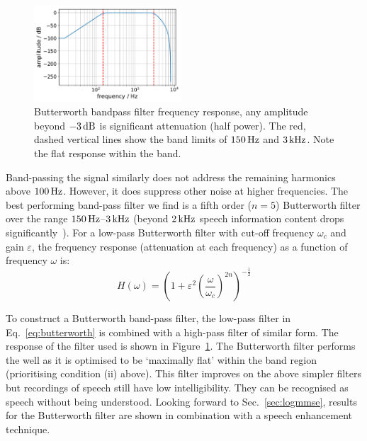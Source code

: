 \documentclass[paper-main.tex]{subfiles}
\begin{document}
\begin{figure}
	\includegraphics[width=0.49\textwidth]{figures/butterworth_150_3000.pdf}
	\caption{Butterworth bandpass filter frequency response, any amplitude beyond $-3\,{\rm dB}$ is significant attenuation (half power). The red, dashed vertical lines show the band limits of $150\,{\rm Hz}$ and $3\,{\rm kHz}$. Note the flat response within the band.}
	\label{fig:butterworth}
\end{figure}


Band-passing the signal similarly does not address the remaining harmonics above $100\,{\rm Hz}$. 
However, it does suppress other noise at higher frequencies. 
The best performing band-pass filter we find is a fifth order ($n = 5$) Butterworth filter over the range $150\,{\rm Hz}$--$3\,{\rm kHz}$ (beyond $2\,{\rm kHz}$ speech information content drops significantly~\cite{speech_intelligibility}). 
For a low-pass Butterworth filter with cut-off frequency $\omega_c$ and gain $\varepsilon$, the frequency response (attenuation at each frequency) as a function of frequency $\omega$ is:
\begin{equation}
\label{eq:butterworth}
H(\omega) = \left(1+\varepsilon^2 \left( \frac{\omega}{\omega_c} \right)^{2n}\right)^{-\frac{1}{2}}
\end{equation}

To construct a Butterworth band-pass filter, the low-pass filter in Eq.~\ref{eq:butterworth} is combined with a high-pass filter of similar form. 
The response of the filter used is shown in Figure~\ref{fig:butterworth}. 
The Butterworth filter performs the well as it is optimised to be `maximally flat' within the band region (prioritising condition (ii) above).
This filter improves on the above simpler filters but recordings of speech still have low intelligibility.
They can be recognised as speech without being understood.
Looking forward to Sec.~\ref{sec:logmmse}, results for the Butterworth filter are shown in combination with a speech enhancement technique. 
\end{document}
